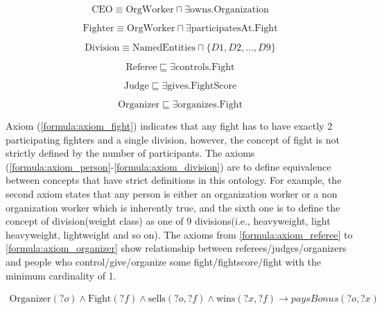 \documentclass[a4paper]{article}
\begin{document}
\begin{equation}
	\text{CEO} \equiv \text{OrgWorker} \sqcap \exists \text{owns}.\text{Organization}
	\label{formula:axiom_ceo}
\end{equation}

\begin{equation}
	\text{Fighter} \equiv \text{OrgWorker} \sqcap \exists \text{participatesAt}.\text{Fight}
	\label{formula:axiom_fighter}
\end{equation}

\begin{equation}
	\text{Division} \equiv \text{NamedEntities} \sqcap \{D1, D2, \dots, D9\}
	\label{formula:axiom_division}
\end{equation}

\begin{equation}
	\text{Referee} \sqsubseteq \exists \text{controls}.\text{Fight}
	\label{formula:axiom_referee}
\end{equation}

\begin{equation}
	\text{Judge} \sqsubseteq \exists \text{gives}.\text{FightScore}
	\label{formula:axiom_judge}
\end{equation}

\begin{equation}
	\text{Organizer} \sqsubseteq \exists \text{organizes}.\text{Fight}
	\label{formula:axiom_organizer}
\end{equation}

Axiom (\ref{formula:axiom_fight}) indicates that any fight has to have exactly 2 participating fighters and a single division, however, the concept of fight is not strictly defined by the number of participants.
The axioms (\ref{formula:axiom_person}-\ref{formula:axiom_division}) are to define equivalence between concepts that have strict definitions in this ontology. For example, the second axiom 
states that any person is either an organization worker or a non organization worker which is inherently true, and the sixth one is to define the concept of division(weight class) as one of 9 
divisions(i.e., heavyweight, light heavyweight, lightweight and so on). The axioms from \ref{formula:axiom_referee} to \ref{formula:axiom_organizer} show relationship between referees/judges/organizers 
and people who control/give/organize some fight/fightscore/fight with the minimum cardinality of 1.

\begin{align}
	\text{Organizer}(?o) \land \text{Fight}(?f) \land \text{sells}(?o, ?f) \land \text{wins}(?x, ?f) \rightarrow paysBonus(?o, ?x)
	\label{formula:swrl_bonusRule}
\end{align}
\end{document}
